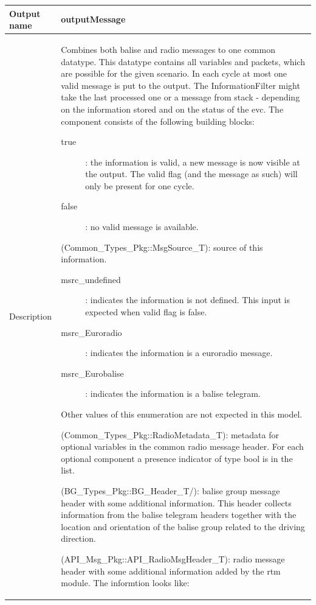 \begin{longtable}{p{}p{}}
\toprule
Output name				& outputMessage \\
\midrule
Description				& Combines both balise and radio messages to one common datatype. This datatype contains all variables and packets, which are possible for the given scenario. In each cycle at most one valid message is put to the output. The InformationFilter might take the last processed one or a message from stack - depending on the information stored and on the status of the evc. The component consists of the following building blocks:
\begin{description}
\begin{description}
\item[true]: the information is valid, a new message is now visible at the output. The valid flag (and the message as such) will only be present for one cycle.
\item[false]: no valid message is available.
\end{description}
\item[source](Common\_Types\_Pkg::MsgSource\_T): source of this information. 
\begin{description}
\item[msrc\_undefined]: indicates the information is not defined. This input is expected when valid flag is false.
\item[msrc\_Euroradio]: indicates the information is a euroradio message.
\item[msrc\_Eurobalise]: indicates the information is a balise telegram.
\end{description}
Other values of this enumeration are not expected in this model.
\item[radioMetadata](Common\_Types\_Pkg::RadioMetadata\_T): metadata for optional variables in the common radio message header. For each optional component a presence indicator of type bool is in the list.  
\item[BG_Common_Header](BG\_Types\_Pkg::BG_Header\_T/): balise group message header with some additional information. This header collects information from the balise telegram headers together with the location and orientation of the balise group related to the driving direction.
\item[Radio\_Common\_Header](API\_Msg\_Pkg::API\_RadioMsgHeader\_T): radio message header with some additional information added by the rtm module. The informtion looks like:
\begin{description}

\end{description}
\end{description}
\end{longtable}
